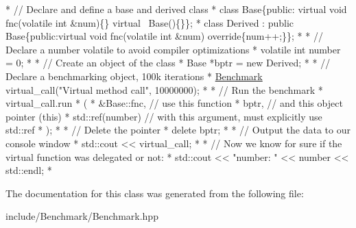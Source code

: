\begin{DoxyCode}
*  \textcolor{comment}{// Declare and define a base and derived class}
*  \textcolor{keyword}{class }Base\{\textcolor{keyword}{public}: \textcolor{keyword}{virtual} \textcolor{keywordtype}{void} fnc(\textcolor{keyword}{volatile} \textcolor{keywordtype}{int} &num)\{\} \textcolor{keyword}{virtual} ~Base()\{\}\};
*  \textcolor{keyword}{class }Derived : \textcolor{keyword}{public} Base\{\textcolor{keyword}{public}:\textcolor{keyword}{virtual} \textcolor{keywordtype}{void} fnc(\textcolor{keyword}{volatile} \textcolor{keywordtype}{int} &num)\textcolor{keyword}{ override}\{num++;\}\};
* 
*  \textcolor{comment}{// Declare a number volatile to avoid compiler optimizations}
*  \textcolor{keyword}{volatile} \textcolor{keywordtype}{int} number = 0;
* 
*  \textcolor{comment}{// Create an object of the class}
*  Base *bptr = \textcolor{keyword}{new} Derived;
* 
*  \textcolor{comment}{// Declare a benchmarking object, 100k iterations}
*  \hyperlink{class_benchmark}{Benchmark} virtual\_call(\textcolor{stringliteral}{"Virtual method call"}, 10000000);
* 
*  \textcolor{comment}{// Run the benchmark}
*  virtual\_call.run
*  (
*      &Base::fnc, \textcolor{comment}{// use this function}
*      bptr, \textcolor{comment}{// and this object pointer (this)}
*      std::ref(number) \textcolor{comment}{// with this argument, must explicitly use std::ref}
*  );
* 
*  \textcolor{comment}{// Delete the pointer}
*  \textcolor{keyword}{delete} bptr;
* 
*  \textcolor{comment}{// Output the data to our console window}
*  std::cout << virtual\_call;
* 
*  \textcolor{comment}{// Now we know for sure if the virtual function was delegated or not:}
*  std::cout << \textcolor{stringliteral}{"number: "} << number << std::endl;
*  
\end{DoxyCode}
 

The documentation for this class was generated from the following file\-:\begin{DoxyCompactItemize}
\item 
include/\-Benchmark/Benchmark.\-hpp\end{DoxyCompactItemize}
